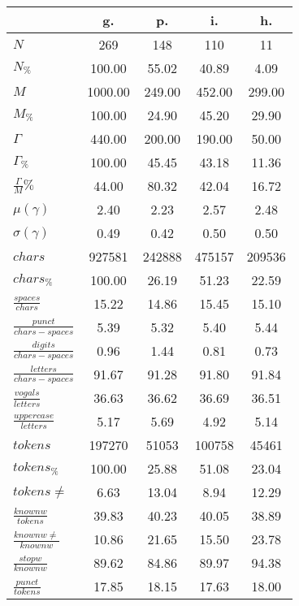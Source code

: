 \begin{table}[h!]
\begin{center}
\begin{tabular}{| l || c | c | c | c |}\hline
 & {\bf g.} & {\bf p.} & {\bf i.} & {\bf h.} \\\hline\hline
$N$ & 269  & 148  & 110  & 11 \\
$N_{\%}$ & 100.00  & 55.02  & 40.89  & 4.09 \\\hline
$M$ & 1000.00  & 249.00  & 452.00  & 299.00 \\
$M_{\%}$ & 100.00  & 24.90  & 45.20  & 29.90 \\\hline
$\Gamma$ & 440.00  & 200.00  & 190.00  & 50.00 \\
$\Gamma_{\%}$ & 100.00  & 45.45  & 43.18  & 11.36 \\\hline
$\frac{\Gamma}{M}\%$ & 44.00  & 80.32  & 42.04  & 16.72 \\
$\mu(\gamma)$ & 2.40  & 2.23  & 2.57  & 2.48 \\
$\sigma(\gamma)$ & 0.49  & 0.42  & 0.50  & 0.50 \\\hline\hline
$chars$ & 927581  & 242888  & 475157  & 209536 \\
$chars_{\%}$ & 100.00  & 26.19  & 51.23  & 22.59 \\\hline
$\frac{spaces}{chars}$ & 15.22  & 14.86  & 15.45  & 15.10 \\
$\frac{punct}{chars-spaces}$ & 5.39  & 5.32  & 5.40  & 5.44 \\
$\frac{digits}{chars-spaces}$ & 0.96  & 1.44  & 0.81  & 0.73 \\\hline
$\frac{letters}{chars-spaces}$ & 91.67  & 91.28  & 91.80  & 91.84 \\
$\frac{vogals}{letters}$ & 36.63  & 36.62  & 36.69  & 36.51 \\
$\frac{uppercase}{letters}$ & 5.17  & 5.69  & 4.92  & 5.14 \\\hline\hline
$tokens$ & 197270  & 51053  & 100758  & 45461 \\
$tokens_{\%}$ & 100.00  & 25.88  & 51.08  & 23.04 \\
$tokens \neq$ & 6.63  & 13.04  & 8.94  & 12.29 \\\hline
$\frac{knownw}{tokens}$ & 39.83  & 40.23  & 40.05  & 38.89 \\
$\frac{knownw \neq}{knownw}$ & 10.86  & 21.65  & 15.50  & 23.78 \\\hline
$\frac{stopw}{knownw}$ & 89.62  & 84.86  & 89.97  & 94.38 \\
$\frac{punct}{tokens}$ & 17.85  & 18.15  & 17.63  & 18.00 \\

\end{tabular}
\end{center}
\end{table}
